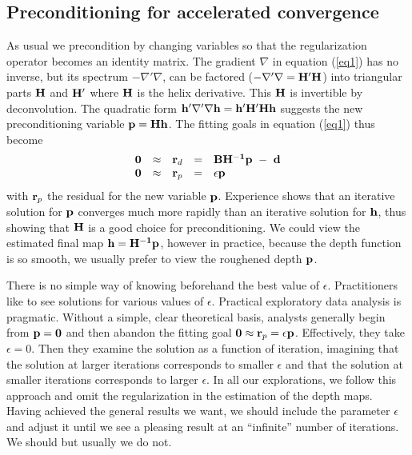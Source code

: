 \subsection{Preconditioning for accelerated convergence}

As usual we
precondition by changing variables so
that the regularization operator becomes an identity matrix.
The gradient $\nabla$ in equation (\ref{eq1}) has no inverse, but its
spectrum $-\nabla'\nabla$,
can be factored ($-\nabla'\nabla={\bf H'H}$) into triangular parts 
${\bf H}$ and ${\bf H'}$ where ${\bf H}$ is the helix derivative.
This ${\bf H}$ is invertible by deconvolution.
The quadratic form
$\bold h'\nabla'\nabla\bold h = \bold h'\bold H'\bold H \bold h$
suggests the new preconditioning variable $\bold p = \bold H\bold h$.
The fitting goals in equation (\ref{eq1}) thus become
\begin{equation}
  \begin{array}{lllll}
    \bold 0 &\approx& \bold r_d &=& \bold B \bold {H^{-1}} \bold p \ -\  \bold d \\
    \bold 0 &\approx& \bold r_p &=& \epsilon \bold p
  \end{array} \label{eq2}
\end{equation}
with $\bold r_p$ the residual for the new variable ${\bf p}$.
Experience shows that an iterative solution for ${\bf p}$ converges much
more rapidly than an iterative solution for ${\bf h}$,
thus showing that ${\bf H}$ is a good choice for preconditioning. 
We could view the estimated final map ${\bf h}={\bf H^{-1}p}$,
however in practice, because the depth function is so smooth,
we usually prefer to view the roughened depth $\bold p$.


\par
There is no simple way of knowing beforehand the best value of $\epsilon$.
Practitioners like to see solutions for various values of $\epsilon$.
Practical exploratory data analysis is pragmatic.
Without a simple, clear theoretical basis, analysts
generally begin from ${\bf p=0}$ and then abandon the fitting goal
$\bold 0 \approx  \bold r_p =\epsilon \bold p$.
Effectively, they take $\epsilon=0$.
Then they examine the solution as a function
of iteration, imagining that the solution at larger iterations
corresponds to smaller $\epsilon$ and that the solution at smaller iterations
corresponds to larger $\epsilon$.
In all our explorations, we follow this approach
and omit the regularization in the estimation of the depth maps.
Having achieved the general results we want,
we should include the parameter $\epsilon$ and adjust it until
we see a pleasing result at an ``infinite'' number of iterations.
We should but usually we do not.


